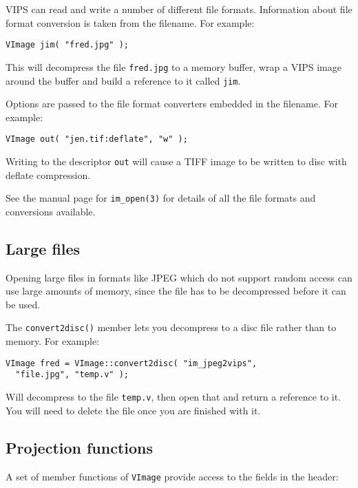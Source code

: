 VIPS can read and write a number of different file formats. Information about
file format conversion is taken from the filename. For example:

\begin{verbatim}
VImage jim( "fred.jpg" );
\end{verbatim}

\noindent
This will decompress the file \verb+fred.jpg+ to a memory buffer, wrap a VIPS
image around the buffer and build a reference to it called \verb+jim+.

Options are passed to the file format converters embedded in the filename. For
example:

\begin{verbatim}
VImage out( "jen.tif:deflate", "w" );
\end{verbatim}

\noindent

\noindent
Writing to the descriptor \verb+out+ will cause a TIFF image to be written to
disc with deflate compression.

See the manual page for \verb+im_open(3)+ for details of all the file formats
and conversions available.

\subsection{Large files}

Opening large files in formats like JPEG which do not support random access
can use large amounts of memory, since the file has to be decompressed before
it can be used.

The \verb+convert2disc()+ member lets you decompress to a disc file rather
than to memory. For example:

\begin{verbatim}
VImage fred = VImage::convert2disc( "im_jpeg2vips", 
  "file.jpg", "temp.v" );
\end{verbatim}

\noindent
Will decompress to the file \verb+temp.v+, then open that and return a
reference to it. You will need to delete the file once you are finished with
it.

\subsection{Projection functions}

A set of member functions of \verb+VImage+ provide access to the fields in
the header:

